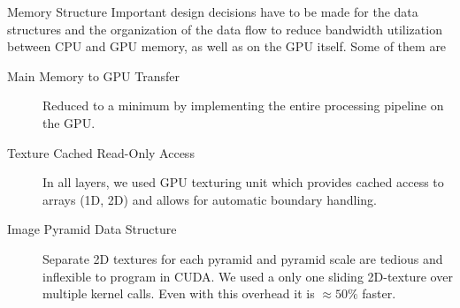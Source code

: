 \documentclass[final]{beamer}
\begin{document}
\begin{frame}{}
\begin{columns}[t]
      \begin{column}{.48\linewidth}
        \begin{block}{Memory Structure}
          Important design decisions have to be made for the data structures and
the organization of the data flow to reduce bandwidth utilization
between CPU and GPU memory, as well as on the GPU itself. Some of them are
\begin{description}
\item[ Main Memory to GPU Transfer ] 
Reduced to a minimum by implementing the entire processing pipeline on the GPU.\\
\item[ Texture Cached Read-Only Access]
In all layers, we used GPU texturing unit which provides cached access to arrays (1D, 2D) and allows for automatic boundary handling.
\item [ Image Pyramid Data Structure]
Separate 2D textures for each pyramid and pyramid scale are tedious and inflexible to program in CUDA.
We used a only one sliding 2D-texture over multiple kernel calls. Even with this overhead it is $\approx 50\%$ faster.
\end{description}
        \end{block}




\end{column}
\end{columns}
\end{frame}
\end{document}

